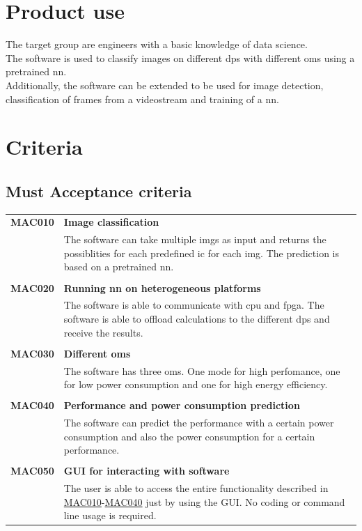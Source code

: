 \documentclass[parskip=full]{scrartcl}
\begin{document}
\section{Product use}
The target group are engineers with a basic knowledge of data science.\\
The software is used to classify images on different \glspl{dp} with different \glspl{om} using a pretrained \gls{nn}.\\
Additionally, the software can be extended to be used for image detection, classification of frames from a videostream and training of a \gls{nn}.


\section{Criteria}
\subsection{Must Acceptance criteria}
\begin{tabular}{p{2cm}p{11.4cm}}
\textbf{MAC010} \hypertarget{MAC010} & \textbf{Image classification} \\
& The software can take multiple \glspl{img} as input and returns the possiblities for each predefined \gls{ic} for each \gls{img}. The prediction is based on a pretrained \gls{nn}.\\
& \\
\textbf{MAC020} \hypertarget{MAC020} & \textbf{Running \gls{nn} on heterogeneous platforms} \\
& The software is able to communicate with \gls{cpu} and \gls{fpga}. The software is able to offload calculations to the different \glspl{dp} and receive the results.\\
& \\
\textbf{MAC030} \hypertarget{MAC030} & \textbf{Different \glspl{om}} \\
& The software has three \glspl{om}. One mode for high perfomance, one for low \gls{power consumption} and one for high energy efficiency. \\
& \\
\textbf{MAC040} \hypertarget{MAC040} & \textbf{Performance and \gls{power consumption} prediction}\\
& The software can predict the \gls{performance} with a certain \gls{power consumption} and also the \gls{power consumption} for a certain \gls{performance}.\\
& \\
\textbf{MAC050} \hypertarget{MAC050} & \textbf{GUI for interacting with software} \\
& The user is able to access the entire functionality described in \hyperlink{MAC010}{MAC010}-\hyperlink{MAC040}{MAC040} just by using the GUI. No coding or command line usage is required.
\end{tabular}
\end{document}
